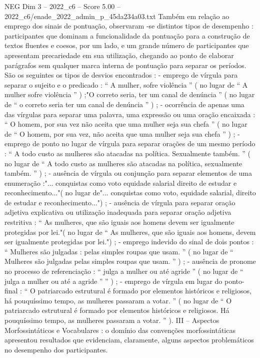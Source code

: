\begin{textsample}{NEG Dim 3 – 2022\_c6 – Score 5.00 – 2022\_c6/enade\_2022\_admin\_p\_45da234a03.txt}
Também em relação ao emprego dos sinais de pontuação, observaram -se distintos tipos de desempenho : participantes que dominam a funcionalidade da pontuação para a construção de textos fluentes e coesos, por um lado, e um grande número de participantes que apresentam precariedade em sua utilização, chegando ao ponto de elaborar parágrafos sem qualquer marca interna de pontuação para separar os períodos.
São os seguintes os tipos de desvios encontrados : - emprego de vírgula para separar o sujeito e o predicado : “ A mulher, sofre violência ” ( no lugar de “ A mulher sofre violência ” ) ;"O correto seria, ter um canal de denúncia ” ( no lugar de “ o correto seria ter um canal de denúncia ” ) ; - ocorrência de apenas uma das vírgulas para separar uma palavra, uma expressão ou uma oração encaixada : “ O homem, por sua vez não aceita que uma mulher seja sua chefa ” ( no lugar de “ O homem, por sua vez, não aceita que uma mulher seja sua chefa ” ) ; - emprego de ponto no lugar de vírgula para separar orações de um mesmo período : “ A todo custo as mulheres são atacadas na política.
Sexualmente também. ” ( no lugar de “ A todo custo as mulheres são atacadas na política, sexualmente também. ” ) ; - ausência de vírgula ou conjunção para separar elementos de uma enumeração :"... conquistas como voto equidade salarial direito de estudar e reconhecimento..."( no lugar de"... conquistas como voto, equidade salarial, direito de estudar e reconhecimento...") ; - ausência de vírgula para separar oração adjetiva explicativa ou utilização inadequada para separar oração adjetiva restritiva : “ As mulheres, que são iguais aos homens devem ser igualmente protegidas por lei."( no lugar de “ As mulheres, que são iguais aos homens, devem ser igualmente protegidas por lei.") ; - emprego indevido do sinal de dois pontos : “ Mulheres são julgadas : pelas simples roupas que usam. ” ( no lugar de “ Mulheres são julgadas pelas simples roupas que usam. ” ) ; - ausência de pronome no processo de referenciação : “ julga a mulher ou até agride ” ( no lugar de “ julga a mulher ou até a agride ” ” ) ; - emprego de vírgula em lugar do ponto-final : “ O patriarcado estrutural é formado por elementos históricos e religiosos, há pouquíssimo tempo, as mulheres passaram a votar. ” ( no lugar de “ O patriarcado estrutural é formado por elementos históricos e religiosos.
Há pouquíssimo tempo, as mulheres passaram a votar. ” ).
III – Aspectos Morfossintáticos e Vocabulares : o domínio das convenções morfossintáticas apresentou resultados que evidenciam, claramente, alguns aspectos problemáticos no desempenho dos participantes.

\end{textsample}
